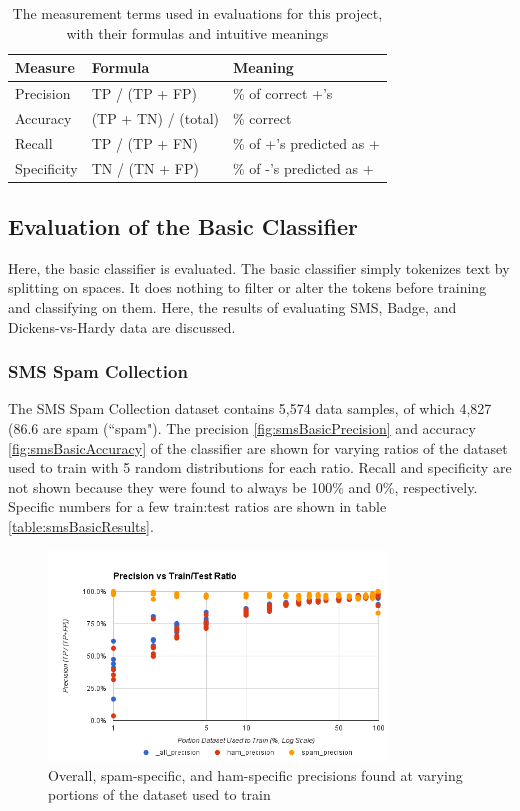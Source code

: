 \begin{table}
    \begin{tabular}{lll}
        \hline
        \textbf{Measure} & \textbf{Formula} & \textbf{Meaning} \\ [0.5ex]
        \hline\hline
        Precision	& TP / (TP + FP) & \% of correct +'s \\
        Accuracy	& (TP + TN) / (total) & \% correct \\
        Recall 	    & TP / (TP + FN) & \% of +'s predicted as + \\
        Specificity	& TN / (TN + FP) & \% of -'s predicted as + \\
        \hline
    \end{tabular}
    \caption{The measurement terms used in evaluations for this project, with their formulas and intuitive meanings}
    \label{table:measures}
\end{table}

\subsection{Evaluation of the Basic Classifier}
\label{subsection:basicResults}
Here, the basic classifier is evaluated. The basic classifier simply tokenizes text by splitting on spaces. It does
nothing to filter or alter the tokens before training and classifying on them. Here, the results of evaluating SMS,
Badge, and Dickens-vs-Hardy data are discussed.

\subsubsection{SMS Spam Collection}
\label{subsection:smsBasic}
The SMS Spam Collection dataset \cite{sms} contains 5,574 data samples, of which 4,827 (86.6%
are spam (``spam"). The precision \ref{fig:smsBasicPrecision} and accuracy \ref{fig:smsBasicAccuracy} of the classifier
are shown for varying ratios of the dataset used to train with 5 random distributions for each ratio. Recall and
specificity are not shown because they were found to always be 100\% and 0\%, respectively. Specific numbers
for a few train:test ratios are shown in table \ref{table:smsBasicResults}.

\begin{figure}[ht!]
    \centering
    \includegraphics[width=90mm]{img/sms_basic-precision.png}
    \caption{Overall, spam-specific, and ham-specific precisions found at varying portions of the dataset used to train}
    \label{fig:spamBasicPrecision}
\end{figure}


